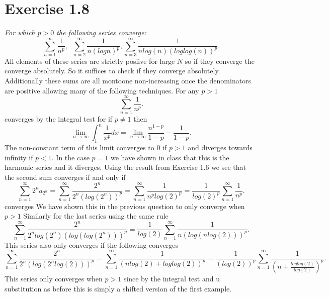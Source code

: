\documentclass{amsart}
\begin{document}
    \section{Exercise 1.8}
    \emph{
        For which $p > 0$ the following series converge:
        \[
        \sum_{n=1}^{\infty}\frac{1}{n^{p}},  \;\; \sum_{n=2}^{\infty}\frac{1}{n(logn)^{p}}, \sum_{n=3}^{\infty}\frac{1}{nlog(n)(loglog(n))^{p}}
        .\] 
    }
    All elements of these series are strictly posiive for large $N$ so if they converge the converge absolutely. So it suffices to check if they converge absolutely.\\
    Additionally these sums are all montoone non-increasing once the denominators are positive allowing many of the following techniques.
    For any $p > 1$
    \[
    \sum_{n=1}^{\infty}\frac{1}{n^{p}}
    .\]
    converges by the integral test for if $p \ne 1$ then
    \[
    \lim_{n\to \infty}\int_{1}^{n}\frac{1}{x^{p}}dx = \lim_{n\to \infty}\frac{n^{1-p}}{1-p} - \frac{1}{1-p}
    .\] 
    The non-constant term of this limit converges to 0 if $p > 1$ and diverges towards infinity if  $p < 1$. In the case $p = 1$ 
    we have shown in class that this is the harmonic series and it diverges.
    Using the result from Exercise 1.6 we see that the second sum converges if and only if
    \[
        \sum_{n=1}^{\infty}2^{n}a_{2^{n}} = \sum_{n=1}^{\infty}\frac{2^{n}}{2^{n}(log(2^{n}))^{p}} = \sum_{n=1}^{\infty} \frac{1}{n^{p}log(2)^{p}} = \frac{1}{log(2)^{p}} \sum_{n=1}^{\infty} \frac{1}{n^{p}}
    .\] 
    converges We have shown this in the previous question to only converge when $p > 1$
    Similarly for the last series using the same rule
    \[
    \sum_{n=1}^{\infty}\frac{2^{n}}{2^{n}log(2^{n})(log(log(2^{n})))^{p}} = \frac{1}{log(2)}\sum_{n=1}^{\infty} \frac{1}{n(log(nlog(2)))^{p}}
    .\] 
    This series also only converges if the following converges
    \[
    \sum_{n=1}^{\infty} \frac{2^{n}}{2^{n}(log(2^{n}log(2)))^{p}} = \sum_{n=1}^{\infty}\frac{1}{(nlog(2) + loglog(2))^{p}} = \frac{1}{(log(2))^{p}}\sum_{n=1}^{\infty}\frac{1}{(n+\frac{loglog(2)}{log(2)})^{p}}
    .\] 
    This series only converges when $p > 1$ since by the integral test and u substitution as before this is simply a shifted version of the first example.
\end{document}
